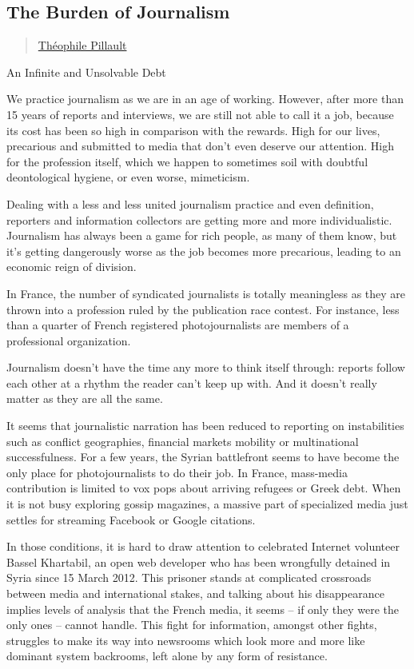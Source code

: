 \subsection{The Burden of Journalism}\label{the-burden-of-journalism}

\begin{quote}
\hyperlink{theophile-pillault}{Théophile
Pillault}
\end{quote}

An Infinite and Unsolvable Debt

We practice journalism as we are in an age of working. However, after
more than 15 years of reports and interviews, we are still not able to
call it a job, because its cost has been so high in comparison with the
rewards. High for our lives, precarious and submitted to media that
don't even deserve our attention. High for the profession itself, which
we happen to sometimes soil with doubtful deontological hygiene, or even
worse, mimeticism.

Dealing with a less and less united journalism practice and even
definition, reporters and information collectors are getting more and
more individualistic. Journalism has always been a game for rich people,
as many of them know, but it's getting dangerously worse as the job
becomes more precarious, leading to an economic reign of division.

In France, the number of syndicated journalists is totally meaningless
as they are thrown into a profession ruled by the publication race
contest. For instance, less than a quarter of French registered
photojournalists are members of a professional organization.

Journalism doesn't have the time any more to think itself through:
reports follow each other at a rhythm the reader can't keep up with. And
it doesn't really matter as they are all the same.

It seems that journalistic narration has been reduced to reporting on
instabilities such as conflict geographies, financial markets mobility
or multinational successfulness. For a few years, the Syrian battlefront
seems to have become the only place for photojournalists to do their
job. In France, mass-media contribution is limited to vox pops about
arriving refugees or Greek debt. When it is not busy exploring gossip
magazines, a massive part of specialized media just settles for
streaming Facebook or Google citations.

In those conditions, it is hard to draw attention to celebrated Internet
volunteer Bassel Khartabil, an open web developer who has been
wrongfully detained in Syria since 15 March 2012. This prisoner stands
at complicated crossroads between media and international stakes, and
talking about his disappearance implies levels of analysis that the
French media, it seems -- if only they were the only ones -- cannot
handle. This fight for information, amongst other fights, struggles to
make its way into newsrooms which look more and more like dominant
system backrooms, left alone by any form of resistance.

